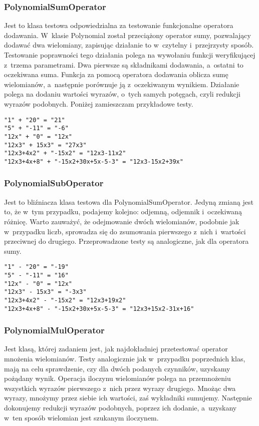 \subsubsection{PolynomialSumOperator}

Jest to klasa testowa odpowiedzialna za testowanie funkcjonalne operatora dodawania. W~klasie Polynomial został przeciążony operator sumy, pozwalający dodawać dwa wielomiany, zapisując działanie to w~czytelny i~przejrzysty sposób. Testowanie poprawności tego działania polega na wywołaniu funkcji weryfikującej z~trzema parametrami. Dwa pierwsze są składnikami dodawania, a~ostatni to oczekiwana suma. Funkcja za pomocą operatora dodawania oblicza sumę wielomianów, a~następnie porównuje ją z~oczekiwanym wynikiem. Działanie polega na dodaniu wartości wyrazów, o~tych samych potęgach, czyli redukcji wyrazów podobnych. Poniżej zamieszczam przykładowe testy.

\begin{lstlisting}
"1" + "20" = "21"
"5" + "-11" = "-6"
"12x" + "0" = "12x"
"12x3" + 15x3" = "27x3"
"12x3+4x2" + "-15x2" = "12x3-11x2"
"12x3+4x+8" + "-15x2+30x+5x-5-3" = "12x3-15x2+39x"
\end{lstlisting}

\subsubsection{PolynomialSubOperator}

Jest to bliźniacza klasa testowa dla PolynomialSumOperator. Jedyną zmianą jest to, że w~tym przypadku, podajemy kolejno: odjemną, odjemnik i~oczekiwaną różnicę. Warto zauważyć, że odejmowanie dwóch wielomianów, podobnie jak w~przypadku liczb, sprowadza się do zsumowania pierwszego z~nich i~wartości przeciwnej do drugiego. Przeprowadzone testy są analogiczne, jak dla operatora sumy.

\begin{lstlisting}
"1" - "20" = "-19"
"5" - "-11" = "16"
"12x" - "0" = "12x"
"12x3" - 15x3" = "-3x3"
"12x3+4x2" - "-15x2" = "12x3+19x2"
"12x3+4x+8" - "-15x2+30x+5x-5-3" = "12x3+15x2-31x+16"
\end{lstlisting}

\subsubsection{PolynomialMulOperator}

Jest klasą, której zadaniem jest, jak najdokładniej przetestować operator mnożenia wielomianów. Testy analogicznie jak w~przypadku poprzednich klas, mają na celu sprawdzenie, czy dla dwóch podanych czynników, uzyskamy pożądany wynik. Operacja iloczynu wielomianów polega na przemnożeniu wszystkich wyrazów pierwszego z~nich przez wyrazy drugiego. Mnożąc dwa wyrazy, mnożymy przez siebie ich wartości, zaś wykładniki sumujemy. Następnie dokonujemy redukcji wyrazów podobnych, poprzez ich dodanie, a~uzyskany w~ten sposób wielomian jest szukanym iloczynem.

